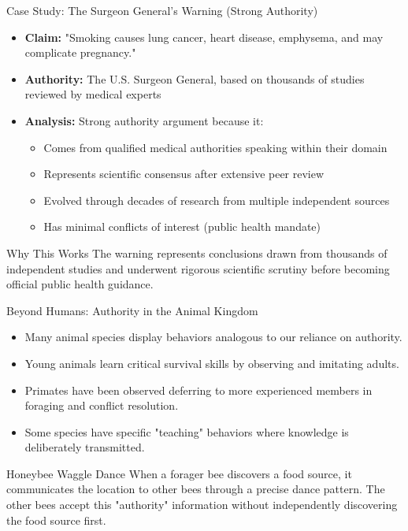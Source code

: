 \documentclass{beamer}
\begin{document}
\begin{frame}{Case Study: The Surgeon General's Warning (Strong Authority)}
	\begin{itemize}
		\item \textbf{Claim:} "Smoking causes lung cancer, heart disease, emphysema, and may complicate pregnancy."
		\item \textbf{Authority:} The U.S. Surgeon General, based on thousands of studies reviewed by medical experts
		\item \textbf{Analysis:} Strong authority argument because it:
		\begin{itemize}
			\item Comes from qualified medical authorities speaking within their domain
			\item Represents scientific consensus after extensive peer review
			\item Evolved through decades of research from multiple independent sources
			\item Has minimal conflicts of interest (public health mandate)
		\end{itemize}
	\end{itemize}
	
	\begin{alertblock}{Why This Works}
		The warning represents conclusions drawn from thousands of independent studies and underwent rigorous scientific scrutiny before becoming official public health guidance.
	\end{alertblock}
\end{frame}

\begin{frame}{Beyond Humans: Authority in the Animal Kingdom}
    \begin{itemize}
        \item Many animal species display behaviors analogous to our reliance on authority.
        \item Young animals learn critical survival skills by observing and imitating adults.
        \item Primates have been observed deferring to more experienced members in foraging and conflict resolution.
        \item Some species have specific "teaching" behaviors where knowledge is deliberately transmitted.
    \end{itemize}
    
    \begin{example}{Honeybee Waggle Dance}
        When a forager bee discovers a food source, it communicates the location to other bees through a precise dance pattern. The other bees accept this "authority" information without independently discovering the food source first.
    \end{example}
\end{frame}
\end{document}
